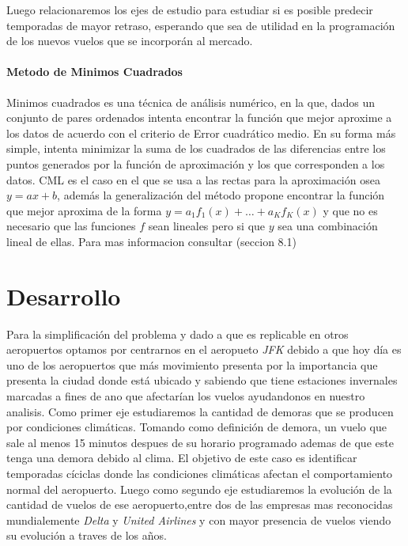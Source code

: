 \documentclass{endm}
\begin{document}
Luego relacionaremos los ejes de estudio para estudiar si es posible predecir temporadas de mayor retraso, esperando que sea de utilidad en la programaci\'on de los nuevos vuelos que se incorporán al mercado.


\paragraph{Metodo de Minimos Cuadrados}

Minimos cuadrados es una t\'ecnica de an\'alisis num\'erico, en la que, dados un conjunto de pares ordenados intenta encontrar la funci\'on que mejor aproxime a los datos de acuerdo con el criterio de Error cuadr\'atico medio. En su forma m\'as simple, intenta minimizar la suma de los cuadrados de las diferencias entre los puntos generados por la funci\'on de aproximaci\'on y los que corresponden a los datos. CML es el caso en el que se usa a las rectas para la aproximaci\'on osea $y = ax + b$, adem\'as la generalizaci\'on del m\'etodo propone encontrar la funci\'on que mejor aproxima de la forma $y = a_1f_1(x) + \dots + a_Kf_K(x)$ y que no es necesario que las funciones $f$ sean lineales pero si que $y$ sea una combinaci\'on lineal de ellas. Para mas informacion consultar  \cite{bf} (seccion 8.1)

\section{Desarrollo}

Para la simplificaci\'on del problema y dado a que es replicable en otros aeropuertos optamos por centrarnos en el aeropueto \textit{JFK} debido a que hoy d\'ia es uno de los aeropuertos que m\'as movimiento presenta por la importancia que presenta la ciudad donde est\'a ubicado y sabiendo que tiene estaciones invernales marcadas a fines de a\˜no que afectar\'ian los vuelos ayudandonos en nuestro analisis.  Como primer eje estudiaremos la cantidad de demoras que se producen por condiciones clim\'aticas. Tomando como definici\'on de demora, un vuelo que sale al menos 15 minutos despues de su horario programado ademas de que este tenga una demora debido al clima. El objetivo de este caso es identificar temporadas c\'iciclas donde las condiciones clim\'aticas afectan el comportamiento normal del aeropuerto. Luego como segundo eje estudiaremos la evoluci\'on de la cantidad de vuelos de ese aeropuerto,entre dos de las empresas mas reconocidas mundialemente \textit{Delta} y \textit{United Airlines} y con mayor presencia de vuelos viendo su evoluci\'on a traves de los a\~nos.
\end{document}
